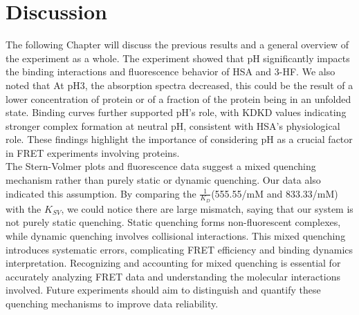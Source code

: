 \documentclass[a4paper,english,12pt,bibliography=totoc]{scrreprt}
\begin{document}
\chapter{Discussion}
\label{cha:Discussion}
The following Chapter will discuss the previous results and a general overview of the experiment as a whole.
The experiment showed that pH significantly impacts the binding interactions and fluorescence behavior of HSA and 3-HF. We also noted that At pH3, the absorption spectra decreased, this could be the result of a lower concentration of protein or of a fraction of the protein being in an unfolded state.  Binding curves further supported pH's role, with KDKD values indicating stronger complex formation at neutral pH, consistent with HSA's physiological role. These findings highlight the importance of considering pH as a crucial factor in FRET experiments involving proteins.\\

The Stern-Volmer plots and fluorescence data suggest a mixed quenching mechanism rather than purely static or dynamic quenching. Our data also indicated this assumption. By comparing the $\frac{1}{K_D}$(555.55/mM and 833.33/mM) with the $K_{SV}$, we could notice there are large mismatch, saying that our system is not purely static quenching. Static quenching forms non-fluorescent complexes, while dynamic quenching involves collisional interactions.  This mixed quenching introduces systematic errors, complicating FRET efficiency and binding dynamics interpretation. Recognizing and accounting for mixed quenching is essential for accurately analyzing FRET data and understanding the molecular interactions involved. Future experiments should aim to distinguish and quantify these quenching mechanisms to improve data reliability.


\printbibliography
\end{document}
